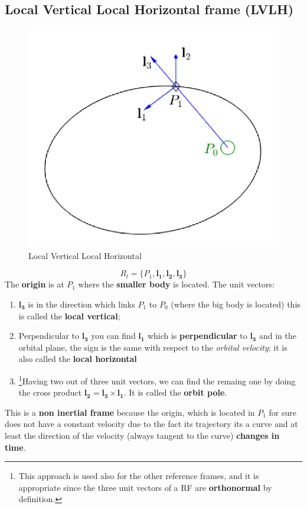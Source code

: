 \subsection{\textsf{\textbf{Local Vertical Local Horizontal frame (LVLH)}}}
\vspace{-0.5em}
\begin{figure}[h]
    \centering
    \includegraphics[scale=0.5]{AerospaceApplications/images/LVLH.png}
    \caption{Local Vertical Local Horizontal}
\end{figure}
\vspace{-1em}
{\Large\color{blue}
\begin{equation}
    R_l = \{
        P_1, \mathbf{l_1, l_2, l_3}
    \}
\end{equation}
}
The \textbf{origin} is at $P_1$ where the \textbf{smaller body} is located. The unit vectors:
\begin{enumerate}
    \item $\mathbf{l_3}$ is in the direction which links $P_1$ to $P_0$ (where the big body is located) this is called the \textbf{local vertical}; 
    \item Perpendicular to $\mathbf{l_3}$ you can find $\mathbf{l_1}$ which is \textbf{perpendicular} to $\mathbf{l_3}$ and in the orbital plane, the sign is the same with respect to the \textit{orbital velocity}; it is also called the \textbf{local horizontal}
    \item {\footnote[9]{
        This approach is used also for the other reference frames, and it is appropriate since the three unit vectors of a RF are \textbf{orthonormal} by definition.
    }}Having two out of three unit vectors, we can find the remaing one by doing the cross product $\mathbf{l_2} = \mathbf{l_3} \times \mathbf{l_1}$. It is called the \textbf{orbit pole}.
\end{enumerate} 
This is a \textbf{non inertial frame} because the origin, which is located in $P_1$ for sure does not have a constant velocity due to the fact its trajectory its a curve and at least the direction of the velocity (always tangent to the curve) \textbf{changes in time}.

